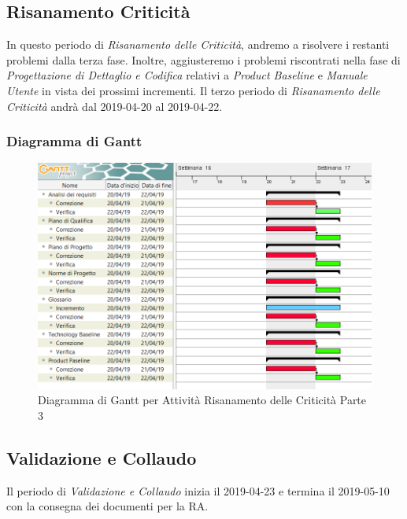 \subsection{Risanamento Criticità}
\label{RC3}
In questo periodo di \textit{Risanamento delle Criticità}, andremo a risolvere i restanti problemi dalla terza fase. Inoltre, aggiusteremo i problemi riscontrati nella fase di \textit{Progettazione di Dettaglio e Codifica} relativi a \textit{Product Baseline} e \textit{Manuale Utente} in vista dei prossimi incrementi.
Il terzo periodo di \textit{Risanamento delle Criticità} andrà dal 2019-04-20 al 2019-04-22.

\subsubsection{Diagramma di Gantt}
\begin{figure}[h]
	\centering
  		\includegraphics[width=1.0\linewidth]{./images/RisanamentoCriticita3.png}
  		\caption{Diagramma di Gantt per Attività Risanamento delle Criticità Parte 3}
  		\label{fig:Gantt Risananmento Criticità 3}
\end{figure}

\newpage
\subsection{Validazione e Collaudo}
\label{VEC}
Il periodo di \textit{Validazione e Collaudo} inizia il 2019-04-23 e termina il 2019-05-10 con la consegna dei documenti per la RA. 

